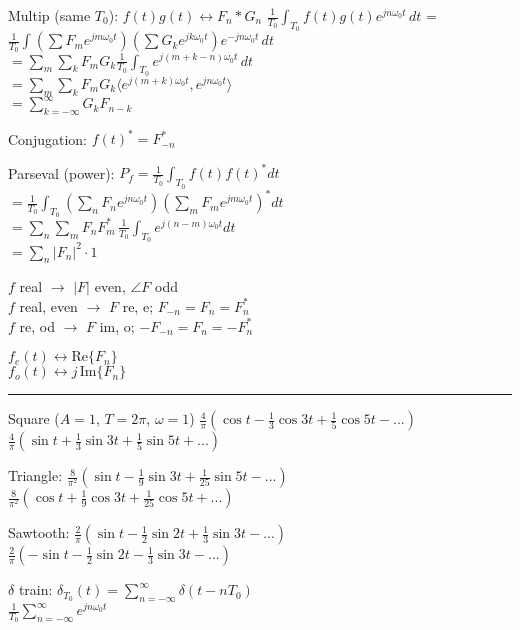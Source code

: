 \documentclass[4pt]{article}
\theoremstyle{definition}
\theoremstyle{definition}
\renewcommand{\o}{\omega}
\newcommand{\ra}{\rightarrow}
\newcommand{\lra}{\leftrightarrow}
\begin{document}
    Multip (same $T_0$): $f(t) g(t) \lra F_n * G_n$ 
        $\frac 1{T_0}  \int_{T_0} f(t) g(t) e^{jn\o_0 t}\, dt$ =\\
        $ \frac{1}{T_0} \int (\sum F_m e^{jm\o_0 t}) (\sum G_k e^{jk\o_0 t}) e^{-jn\o_0 t} \, dt$ \\
        $ = \sum_m \sum_k F_m G_k \frac{1}{T_0} \int_{T_0} e^{j(m+k-n)\o_0 t} \, dt$\\
        $ = \sum_m \sum_k F_m G_k \langle e^{j(m+k)\o_0 t}, e^{jn\o_0 t}\rangle$\\
        $ = \sum_{k=-\infty}^{\infty} G_k F_{n-k}$
        
    Conjugation: $f(t)^* = F^*_{-n}$

    Parseval (power): \(P_f = \frac 1{T_0}\int_{T_0} f(t) f(t)^* dt\)\\
    \(=\frac{1}{T_0}\int_{T_0} (\sum_n F_n e^{jn\o_0t})(\sum_m F_m e^{jm\o_0t})^* dt\)\\
    \(=\sum_n \sum_m  F_n F_m^* \, \frac{1}{T_0}\int_{T_0} e^{j(n-m)\o_0t} dt\)\\
    \(=\sum_n |F_n|^2 \cdot 1\)

        $f$ real $\ra$ $|F|$ even, $\angle F$ odd\\
        $f$ real, even $\ra$ $F$ re, e; $F_{-n} = F_n = F_n^*$\\
        $f$ re, od $\ra$ $F$ im, o; $-F_{-n} = F_n = -F_n^*$

        $f_e(t) \lra \mathrm{Re}\{ F_n\}$\\
        $f_o(t) \lra j \,\mathrm{Im} \{F_n\}$
\rule{\linewidth}{0.5pt}
    Square ($A=1$, $T=2\pi$, $\omega = 1$) 
        $\frac{4}{\pi}(\cos t - \frac{1}{3}\cos 3t + \frac{1}{5} \cos 5t- ...)$\\
        $\frac{4}{\pi}(\sin t + \frac 1 3 \sin 3t + \frac 1 5 \sin 5t + ...)$

    Triangle: 
        $\frac{8}{\pi^2}(\sin t - \frac{1}{9} \sin 3t + \frac{1}{25} \sin 5t - ...)$\\
        $\frac{8}{\pi^2}(\cos t + \frac 1 9 \cos 3t + \frac 1 {25} \cos 5t + ...)$

    Sawtooth:   
        $\frac 2{\pi} (\sin t - \frac{1}{2} \sin 2t + \frac{1}{3} \sin 3t - ...)$\\
        $\frac 2{\pi} (-\sin t - \frac{1}{2} \sin 2t - \frac{1}{3} \sin 3t - ...)$

    $\delta$ train:     
        $\delta_{T_0} (t) = \sum_{n=-\infty}^{\infty} \delta(t - nT_0)$ \\
        $\frac{1}{T_0} \sum_{n=-\infty}^{\infty} e^{jn\omega_0 t}$
\end{document}

